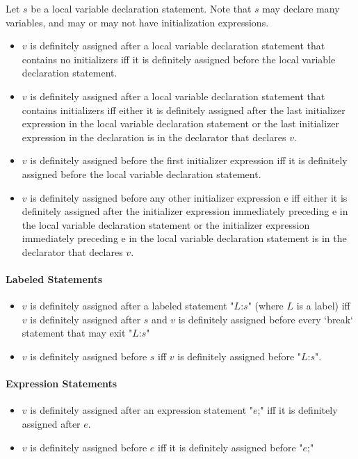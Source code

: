 Let $s$ be a local variable declaration statement.  Note that $s$ may declare
many variables, and may or may not have initialization expressions.

\begin{itemize}
    \item $v$ is definitely assigned after a local variable declaration statement that contains no initializers iff it is definitely assigned before the local variable declaration statement.
    \item $v$ is definitely assigned after a local variable declaration statement that contains initializers iff either it is definitely assigned after the last initializer expression in the local variable declaration statement or the last initializer expression in the declaration is in the declarator that declares $v$.
    \item $v$ is definitely assigned before the first initializer expression iff it is definitely assigned before the local variable declaration statement.
    \item $v$ is definitely assigned before any other initializer expression e iff either it is definitely assigned after the initializer expression immediately preceding e in the local variable declaration statement or the initializer expression immediately preceding e in the local variable declaration statement is in the declarator that declares $v$. 
\end{itemize}

\paragraph{Labeled Statements}
\begin{itemize}
    \item $v$ is definitely assigned after a labeled statement \xcdmath"$L$:$s$" (where $L$ is a label) iff $v$ is definitely assigned after $s$ and $v$ is definitely assigned before every \xcd`break` statement that may exit \xcdmath"$L$:$s$"
    \item $v$ is definitely assigned before $s$ iff $v$ is definitely assigned before \xcdmath"$L$:$s$".\end{itemize}

\paragraph{ Expression Statements}

\begin{itemize}    \item $v$ is definitely assigned after an expression statement \xcdmath"$e$;" iff it is definitely assigned after $e$.
    \item $v$ is definitely assigned before $e$ iff it is definitely assigned before \xcdmath"$e$;"
\end{itemize}

